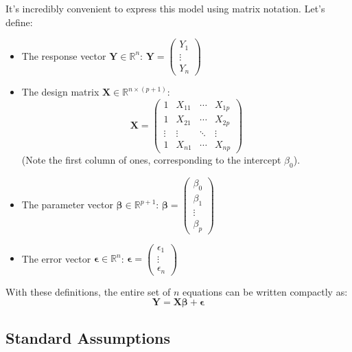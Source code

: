 \documentclass[11pt]{article}
\theoremstyle{definition}
\theoremstyle{remark}
\begin{document}
It's incredibly convenient to express this model using matrix notation. Let's define:
\begin{itemize}
    \item The response vector $\bm{Y} \in \mathbb{R}^n$: $\bm{Y} = \begin{pmatrix} Y_1 \\ \vdots \\ Y_n \end{pmatrix}$
    \item The design matrix $\bm{X} \in \mathbb{R}^{n \times (p+1)}$:
    \[ \bm{X} = \begin{pmatrix}
    1 & X_{11} & \cdots & X_{1p} \\
    1 & X_{21} & \cdots & X_{2p} \\
    \vdots & \vdots & \ddots & \vdots \\
    1 & X_{n1} & \cdots & X_{np}
    \end{pmatrix} \]
    (Note the first column of ones, corresponding to the intercept $\beta_0$).
    \item The parameter vector $\bm{\beta} \in \mathbb{R}^{p+1}$: $\bm{\beta} = \begin{pmatrix} \beta_0 \\ \beta_1 \\ \vdots \\ \beta_p \end{pmatrix}$
    \item The error vector $\bm{\epsilon} \in \mathbb{R}^n$: $\bm{\epsilon} = \begin{pmatrix} \epsilon_1 \\ \vdots \\ \epsilon_n \end{pmatrix}$
\end{itemize}

With these definitions, the entire set of $n$ equations can be written compactly as:
\[ \boxed{\bm{Y} = \bm{X}\bm{\beta} + \bm{\epsilon}} \]

\subsection{Standard Assumptions}
\end{document}
